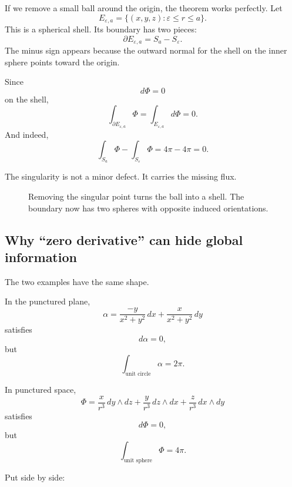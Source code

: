 If we remove a small ball around the origin, the theorem works perfectly.  Let
\[
    E_{\varepsilon,a}
    =
    \{(x,y,z):\varepsilon\le r\le a\}.
\]
This is a spherical shell.  Its boundary has two pieces:
\[
    \partial E_{\varepsilon,a}=S_a- S_\varepsilon.
\]
The minus sign appears because the outward normal for the shell on the inner sphere
points toward the origin.

Since
\[
    d\Phi=0
\]
on the shell,
\[
    \int_{\partial E_{\varepsilon,a}}\Phi
    =
    \int_{E_{\varepsilon,a}}d\Phi
    =
    0.
\]
And indeed,
\[
    \int_{S_a}\Phi-\int_{S_\varepsilon}\Phi
    =
    4\pi-4\pi
    =
    0.
\]

The singularity is not a minor defect.  It carries the missing flux.

\begin{figure}[h]
\centering
{}
\caption{Removing the singular point turns the ball into a shell.  The boundary now has
two spheres with opposite induced orientations.}
\end{figure}

\subsection{Why ``zero derivative'' can hide global information}

The two examples have the same shape.

In the punctured plane,
\[
    \alpha=
    \frac{-y}{x^2+y^2}\,dx+
    \frac{x}{x^2+y^2}\,dy
\]
satisfies
\[
    d\alpha=0,
\]
but
\[
    \int_{\text{unit circle}}\alpha=2\pi.
\]

In punctured space,
\[
    \Phi=
    \frac{x}{r^3}\,dy\wedge dz+
    \frac{y}{r^3}\,dz\wedge dx+
    \frac{z}{r^3}\,dx\wedge dy
\]
satisfies
\[
    d\Phi=0,
\]
but
\[
    \int_{\text{unit sphere}}\Phi=4\pi.
\]

Put side by side:

